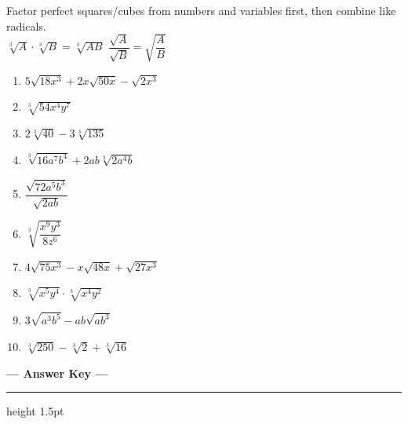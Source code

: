 \documentclass[11pt]{article}
\begin{document}
\begin{tcolorbox}[keybox,title={Strategies}]
Factor perfect squares/cubes from numbers and variables first, then combine like radicals.\\
$\sqrt[3]{A}\cdot\sqrt[3]{B}=\sqrt[3]{AB}$\qquad
$\dfrac{\sqrt{A}}{\sqrt{B}}=\sqrt{\dfrac{A}{B}}$
\end{tcolorbox}

\begin{enumerate}[leftmargin=*,label=\textbf{\arabic*.}]
\item $5\sqrt{18x^3}+2x\sqrt{50x}-\sqrt{2x^3}$\vspace{2.3cm}
\item $\sqrt[3]{54x^4y^7}$\vspace{2.3cm}
\item $2\sqrt[3]{40}-3\sqrt[3]{135}$\vspace{2.3cm}
\item $\sqrt[3]{16a^7b^4}+2ab\sqrt[3]{2a^4b}$\vspace{2.3cm}
\item $\dfrac{\sqrt{72a^5b^3}}{\sqrt{2ab}}$\vspace{2.5cm}
\item $\sqrt[3]{\dfrac{x^9y^3}{8z^6}}$\vspace{2.5cm}
\item $4\sqrt{75x^3}-x\sqrt{48x}+\sqrt{27x^3}$\vspace{2.3cm}
\item $\sqrt[3]{x^5y^4}\cdot\sqrt[3]{x^4y^2}$\vspace{2.3cm}
\item $3\sqrt{a^3b^5}-ab\sqrt{ab^3}$\vspace{2.3cm}
\item $\sqrt[3]{250}-\sqrt[3]{2}+\sqrt[3]{16}$\vspace{2.3cm}
\end{enumerate}

\newpage
\begin{center}
{\LARGE\bfseries\color{maingreen}--- Answer Key ---}
\end{center}
\hrule height 1.5pt\vspace{0.8em}
\end{document}
